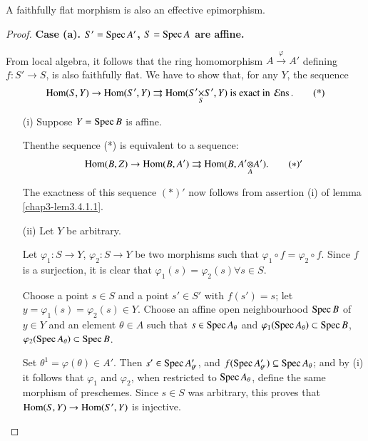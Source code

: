 \subsection{}\label{chap3-sec3.4.2}

\setcounter{subsubsection}{2}
\begin{subprop}\label{chap3-prop3.4.2.1}
A faithfully flat morphism is also an effective epimorphism.
\end{subprop}

\begin{proof}
{\bf Case (a). {\boldmath$S'=\operatorname{Spec} A'$, $S=\operatorname{Spec} A$} are affine.}

From local algebra, it follows that the ring homomorphism
$A\xrightarrow{\varphi}A'$ defining $f:S'\to S$, is also faithfully
flat. We have to show that, for any $Y$, the sequence
\begin{equation*}
\Hom(S,Y)\to \Hom(S',Y)\rightrightarrows \Hom
(\fprod{S'}{S'}{S},Y)\text{\  is exact in } \calEns.\tag{*}
\end{equation*}

\begin{itemize}
\item[(i)] Suppose $Y=\operatorname{Spec} B$ is affine.

Then\pageoriginale the sequence (*) is equivalent to a sequence:
\begin{equation*}
\Hom(B,Z)\to \Hom(B,A')\rightrightarrows
\Hom(B,\foprod{A'}{A'}{A}).\tag*{$(*)'$} 
\end{equation*}

The exactness of this sequence $(\ast)'$ now follows from assertion
(i) of lemma \ref{chap3-lem3.4.1.1}.


\item[(ii)] Let $Y$ be arbitrary.

Let $\varphi_{1}:S\to Y$, $\varphi_{2}:S\to Y$ be two morphisms such
that $\varphi_{1}\circ f=\varphi_{2}\circ f$. Since $f$ is a
surjection, it is clear that $\varphi_{1}(s)=\varphi_{2}(s)\forall
s\in S$.

Choose a point $s\in S$ and a point $s'\in S'$ with $f(s')=s$; let
$y=\varphi_{1}(s)=\varphi_{2}(s)\in Y$. Choose an affine open
neighbourhood $\operatorname{Spec} B$ of $y\in Y$ and an element $\theta\in A$ such
that $s\in \operatorname{Spec} A_{\theta}$ and $\varphi_{1}(\operatorname{Spec} A_{\theta})\subset
\operatorname{Spec} B$, $\varphi_{2}(\operatorname{Spec} A_{\theta})\subset\operatorname{Spec} B$.

Set $\theta^{1}=\varphi(\theta)\in A'$. Then $s'\in \operatorname{Spec}
A'_{\theta'}$, and $f(\operatorname{Spec} A'_{\theta'})\subseteq \operatorname{Spec} A_{\theta}$;
and by (i) it follows that $\varphi_{1}$ and $\varphi_{2}$, when
restricted to $\operatorname{Spec} A_{\theta}$, define the same morphism of
preschemes. Since $s\in S$ was arbitrary, this proves that
$\operatorname{Hom}(S,Y)\to \operatorname{Hom}(S',Y)$ is injective.
\end{itemize}


\end{proof}
